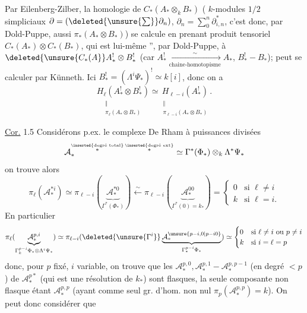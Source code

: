 Par Eilenberg-Zilber, la homologie de
$C_*(A_*\otimes_k B_*)$ (
$k$-modules $1/2$ simpliciaux \deleted{$\unsure{\Phi_*\longrightarrow}$}
$\partial=(\deleted{\unsure{\sum}}\partial_n)$,
$\partial_n=\sum_0^n\partial^*_{i,n}$,
c'est donc, par Dold-Puppe, aussi $\pi_*(A_*\otimes B_*)$)
se calcule en prenant  produit tensoriel
 $C_*(A_*)\otimes C_*(B_*)$, qui est lui-même
'', par Dold-Puppe, à
$\deleted{\unsure{C_*(A}}A_*^!\otimes B_*^!$
(car $A_*^!\xrightarrow[\text{chaine-homotopisme}]{\sim}A_*$,
$B_*^!\mathbin{-}B_*$);
 peut se calculer par Künneth.
Ici $B_*^!=(\Lambda^i\Psi_*)^!\simeq k[i]$, donc on  a
\[
\underset{\substack{\Vert\\\pi_\ell(A_*\otimes B_*)}}{H_\ell(A_*^!\otimes B_*^!)}
\simeq
\underset{\substack{\Vert\\\pi_{\ell-i}(A_*\otimes B_*)}}{H_{\ell-i}(A_*^!)}.
\]

\uline{Cor.} 1.5
Considérons p.ex. le complexe 
De Rham à puissances divisées
\[
\mathcal A_*^{\overset{\inserted{\text{degré total}}}{*}\,\overset{\inserted{\text{degré ext}}}{*}}
\simeq\Gamma^*(\Phi_*)\otimes_k\Lambda^*\Psi_*
\]
on trouve alors
\[
\pi_\ell(\mathcal A_*^{*i})\simeq
\pi_{\ell-i}(\underbrace{\mathcal A_*^{*0}}_{\Gamma^*(\Phi_*)})
\xleftarrow{\sim}\pi_{\ell-i}(\underbrace{\mathcal A_*^{00}}_{\Gamma^*(0)=k_*})
=\begin{cases}0&\text{si }\ell\ne i\\k&\text{si }\ell=i.\end{cases}
\]
En  particulier
\[
\pi_\ell(\underbrace{\mathcal A_*^{p,i}}_{\Gamma_k^{p-i}\Phi_*\otimes\Lambda^i\Psi_*})
\simeq\pi_{\ell-i}(\deleted{\unsure{\Gamma^i}}
\underbrace{\mathcal A_*^{\unsure{p-i,0|p-i0}}}_{\Gamma_*^{p-i}\Phi_*})
\simeq\begin{cases}0&\text{si }\ell\ne i\text{ ou }p\ne i\\k&\text{si }i=\ell=p\end{cases}
\]
donc, pour $p$ fixé, $i$ variable, on trouve que les 
$\mathcal A_*^{p,0},\mathcal A_*^{p,1}\mathbin{-}\mathcal A_*^{p,p-1}$
 (en degré $<p$) de $\mathcal A_*^{p*}$ 
(qui est une résolution de $k_*$) sont flasques, la seule composante non flasque étant
$\mathcal A_*^{p,p}$ (ayant comme seul gr. d'hom. non nul
$\pi_p(\mathcal A_*^{p,p})=k$). On peut donc considérer que
